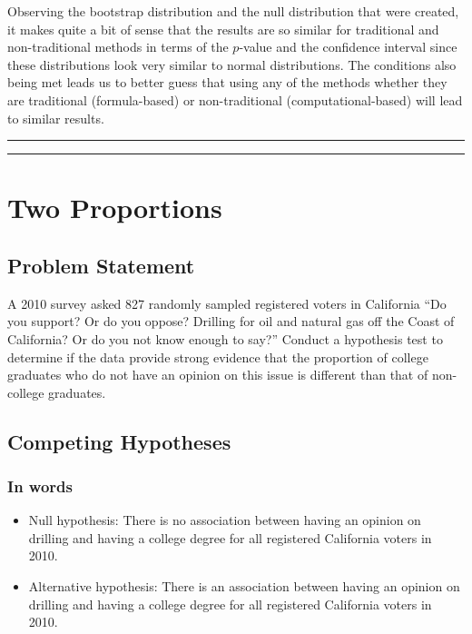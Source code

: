 \documentclass[]{tufte-book}
\let\oldrule=\rule
\renewcommand{\rule}[1]{\oldrule{\linewidth}}
\theoremstyle{definition}
\theoremstyle{definition}
\theoremstyle{remark}
\begin{document}
Observing the bootstrap distribution and the null distribution that were
created, it makes quite a bit of sense that the results are so similar
for traditional and non-traditional methods in terms of the \(p\)-value
and the confidence interval since these distributions look very similar
to normal distributions. The conditions also being met leads us to
better guess that using any of the methods whether they are traditional
(formula-based) or non-traditional (computational-based) will lead to
similar results.

\begin{center}\rule{0.5\linewidth}{\linethickness}\end{center}

\begin{center}\rule{0.5\linewidth}{\linethickness}\end{center}

\section{Two Proportions}\label{two-proportions}

\subsection{Problem Statement}\label{problem-statement-2}

A 2010 survey asked 827 randomly sampled registered voters in California
``Do you support? Or do you oppose? Drilling for oil and natural gas off
the Coast of California? Or do you not know enough to say?'' Conduct a
hypothesis test to determine if the data provide strong evidence that
the proportion of college graduates who do not have an opinion on this
issue is different than that of non-college graduates. \citep[Tweaked a
bit from][ {[}Chapter 6{]}]{isrs2014}

\subsection{Competing Hypotheses}\label{competing-hypotheses-2}

\subsubsection{In words}\label{in-words-2}

\begin{itemize}
\item
  Null hypothesis: There is no association between having an opinion on
  drilling and having a college degree for all registered California
  voters in 2010.
\item
  Alternative hypothesis: There is an association between having an
  opinion on drilling and having a college degree for all registered
  California voters in 2010.
\end{itemize}
\end{document}
